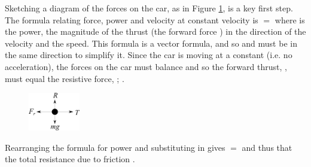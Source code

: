 
\begin{problem}[A1961AMIQ2a] %
{}
{
}
{Sketching a diagram of the forces on the car, as in Figure \ref{fig:Dynamics_car_forces}, is a key first step. The formula relating force, power and velocity at constant velocity is  $=$  where  is the power,  the magnitude of the thrust (the forward force ) in the direction of the velocity and  the speed. This formula is a vector formula, and so  and  must be in the same direction to simplify it. Since the car is moving at a constant  (i.e. no acceleration), the forces on the car must balance and so the forward thrust, , must equal the resistive force, ; .

\begin{figure}[h]
\centering
\includegraphics[width=0.2\textwidth]{../../../figures/Dynamics_car_forces.svg}
\caption{} \label{fig:Dynamics_car_forces}
\end{figure}
Rearranging the formula for power and substituting in  gives  $=$  and thus that the total resistance due to friction .

}
\end{problem}
